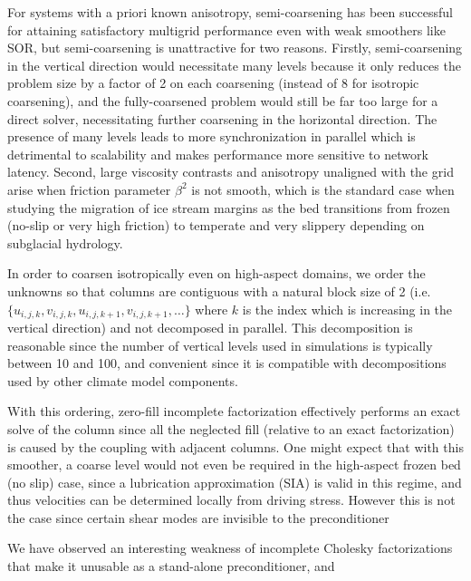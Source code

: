 \documentclass[10pt,letterpaper,oneeqnum,final]{siamltex}
\begin{document}
For systems with a priori known anisotropy, semi-coarsening has been successful for attaining
satisfactory multigrid performance even with weak smoothers like SOR, but semi-coarsening is
unattractive for two reasons.  Firstly, semi-coarsening in the vertical direction would necessitate
many levels because it only reduces the problem size by a factor of 2 on each coarsening (instead of
8 for isotropic coarsening), and the fully-coarsened problem would still be far too large for a
direct solver, necessitating further coarsening in the horizontal direction.  The presence of many
levels leads to more synchronization in parallel which is detrimental to scalability and makes
performance more sensitive to network latency.  Second, large viscosity contrasts and anisotropy
unaligned with the grid arise when friction parameter $\beta^2$ is not smooth, which is the standard
case when studying the migration of ice stream margins as the bed transitions from frozen (no-slip
or very high friction) to temperate and very slippery depending on subglacial hydrology.

In order to coarsen isotropically even on high-aspect domains, we order the unknowns so that columns
are contiguous with a natural block size of 2
(i.e. $\{u_{i,j,k},v_{i,j,k},u_{i,j,k+1},v_{i,j,k+1},\dotsc\}$ where $k$ is the index which is
increasing in the vertical direction) and not decomposed in parallel.  This decomposition is
reasonable since the number of vertical levels used in simulations is typically between 10 and 100,
and convenient since it is compatible with decompositions used by other climate model components.

With this ordering, zero-fill incomplete factorization effectively performs an exact solve of the
column since all the neglected fill (relative to an exact factorization) is caused by the coupling
with adjacent columns.  One might expect that with this smoother, a coarse level would not even be
required in the high-aspect frozen bed (no slip) case, since a lubrication approximation (SIA) is
valid in this regime, and thus velocities can be determined locally from driving stress.  However
this is not the case since certain shear modes are invisible to the preconditioner %

We have observed an interesting weakness of incomplete Cholesky factorizations that make it unusable
as a stand-alone preconditioner, and 
\end{document}
